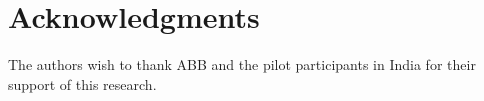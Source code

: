 \documentclass{sig-alternate}
\begin{document}

\section{Acknowledgments}
The authors wish to thank ABB and the pilot participants in India for their support of this research.

%

\balance
 
%
%
\end{document}
